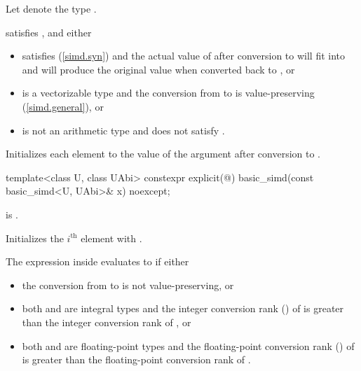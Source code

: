 \begin{itemdescr}
  \pnum Let  denote the type .

  \pnum\constraints
   satisfies , and either
  \begin{itemize}
    \item {} satisfies \tcode{\constexprwrapperlike} (\ref{simd.syn})
      and the actual value of  after conversion to
       will fit into  and will produce the
      original value when converted back to , or

    \item {} is a vectorizable type and the conversion from
       to  is value-preserving
      (\ref{simd.general}), or

    \item {} is not an arithmetic type and does not satisfy
      \tcode{\constexprwrapperlike}.
  \end{itemize}

  \pnum\effects
  Initializes each element to the value of the argument after conversion to .
\end{itemdescr}

\begin{itemdecl}
template<class U, class UAbi>
  constexpr explicit(@\seebelow@) basic_simd(const basic_simd<U, UAbi>& x) noexcept;
\end{itemdecl}

\begin{itemdescr}
  \pnum\constraints
   is .

  \pnum\effects
  Initializes the $i^\text{th}$ element with  \foralli.

  \pnum\remarks
  The expression inside  evaluates to  if either
  \begin{itemize}
    \item the conversion from  to  is not
      value-preserving, or

    \item both  and  are integral types and the
      integer conversion rank () of  is greater than
      the integer conversion rank of , or

    \item both  and  are floating-point types and
      the floating-point conversion rank () of  is
      greater than the floating-point conversion rank of .
  \end{itemize}
\end{itemdescr}

